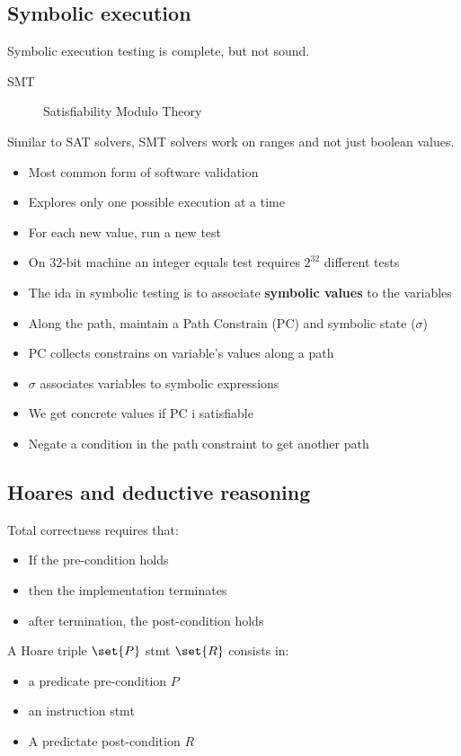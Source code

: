 \documentclass[course, english]{Notes}
\begin{document}
\subsection{Symbolic execution}
Symbolic execution testing is complete, but not sound.
\begin{description}
	\item[SMT]Satisfiability Modulo Theory
\end{description}
Similar to SAT solvers, SMT solvers work on ranges and not just boolean values.
\begin{itemize}
	\item Most common form of software validation
	\item Explores only one possible execution at a time
	\item For each new value, run a new test
	\item On 32-bit machine an integer equals test requires $2^{32}$
		different tests
	\item The ida in symbolic testing is to associate \textbf{symbolic
		values} to the variables
	\item Along the path, maintain a Path Constrain (PC) and symbolic state
		($\sigma$)
	\item PC collects constrains on variable's values along a path
	\item $\sigma$ associates variables to symbolic expressions
	\item We get concrete values if PC i satisfiable
	\item Negate a condition in the path constraint to get another path
\end{itemize}

\subsection{Hoares and deductive reasoning}
Total correctness requires that:
\begin{itemize}
	\item If the pre-condition holds
	\item then the implementation terminates
	\item after termination, the post-condition holds
\end{itemize}
A Hoare triple $\set{P}$ stmt $\set{R}$ consists in:
\begin{itemize}
	\item a predicate pre-condition $P$
	\item an instruction stmt
	\item A predictate post-condition $R$
\end{itemize}
\end{document}
